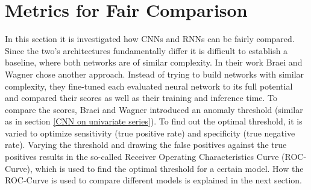 %
%
%
%


\section{Metrics for Fair Comparison}
In this section it is investigated how CNNs and RNNs can be fairly compared. Since the two's architectures fundamentally differ it is difficult to establish a baseline, where both networks are of similar complexity. In their work Braei and Wagner \parencite*{Braei2020} chose another approach. Instead of trying to build networks with similar complexity, they fine-tuned each evaluated neural network to its full potential and compared their scores as well as their training and inference time. To compare the scores, Braei and Wagner \parencite*{Braei2020} introduced an anomaly threshold (similar as in section \ref{CNN on univariate series}). To find out the optimal threshold, it is varied to optimize sensitivity (true positive rate) and specificity (true negative rate). Varying the threshold and drawing the false positives against the true positives results in the so-called Receiver Operating Characteristics Curve (ROC-Curve), which is used to find the optimal threshold for a certain model. How the ROC-Curve is used to compare different models is explained in the next section.

